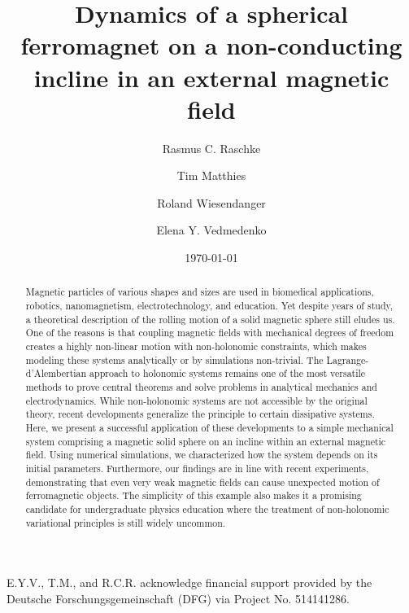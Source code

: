 \documentclass[%
 preprint, linenumbers,
 amsmath,amssymb,
 aps, physrev,
]{revtex4-2}
\begin{document}

\title{\textbf{Dynamics of a spherical ferromagnet on a non-conducting incline in an external magnetic field} 
}%


\author{Rasmus C. Raschke}
\author{Tim Matthies}
\author{Roland Wiesendanger}
\author{Elena Y. Vedmedenko}
%

\date{\today}

\begin{abstract}
Magnetic particles of various shapes and sizes are used in biomedical applications, robotics, nanomagnetism, electrotechnology, and education. Yet despite years of study, a theoretical description of the rolling motion of a solid magnetic sphere still eludes us. One of the reasons is that coupling magnetic fields with mechanical degrees of freedom creates a highly non-linear motion with non-holonomic constraints, which makes modeling these systems analytically or by simulations non-trivial. The Lagrange-d'Alembertian approach to holonomic systems remains one of the most versatile methods to prove central theorems and solve problems in analytical mechanics and electrodynamics. While non-holonomic systems are not accessible by the original theory, recent developments generalize the principle to certain dissipative systems. \newline Here, we present a successful application of these developments to a simple mechanical system comprising a magnetic solid sphere on an incline within an external magnetic field. Using numerical simulations, we characterized how the system depends on its initial parameters. Furthermore, our findings are in line with recent experiments, demonstrating that even very weak magnetic fields can cause unexpected motion of ferromagnetic objects. The simplicity of this example also makes it a promising candidate for undergraduate physics education where the treatment of non-holonomic variational principles is still widely uncommon.
\end{abstract}

\maketitle






\begin{acknowledgments}
E.Y.V., T.M., and R.C.R. acknowledge financial support provided by the Deutsche Forschungsgemeinschaft (DFG) via Project No. 514141286. 
\end{acknowledgments}

\appendix




\end{document}
